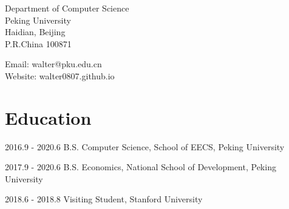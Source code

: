 \documentclass{academiccv}
\begin{document}
\raggedright


\vspace{1em}
\begin{minipage}[t]{0.495\textwidth}
  Department of Computer Science \\
 Peking University\\
  Haidian, Beijing\\
  P.R.China 100871
\end{minipage}
\begin{minipage}[t]{0.495\textwidth}
  Email: walter@pku.edu.cn \\
  Website: walter0807.github.io \\
\end{minipage}
\vspace{0.5em}


\section*{Education}

\begin{tablist}

\item[2016.9 - 2020.6]  \tab B.S. Computer Science, School of EECS, Peking University
\item[2017.9 - 2020.6]  \tab B.S. Economics, National School of Development, Peking University
\item[2018.6 - 2018.8] 	\tab Visiting Student, Stanford University

\end{tablist}
\end{document}
